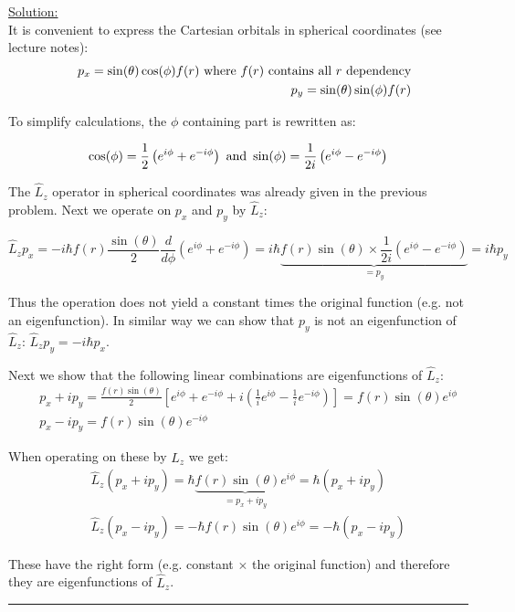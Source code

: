 \noindent
\underline{Solution:}\\

It is convenient to express the Cartesian orbitals in spherical coordinates (see lecture notes):
\begin{eqnarray}
\nonumber
& & p_x = \sin(\theta)\cos(\phi)f(r)\textnormal{ where }f(r)\textnormal{ contains all }r\textnormal{ dependency}\\
\nonumber
& & p_y = \sin(\theta)\sin(\phi)f(r)
\end{eqnarray}

To simplify calculations, the $\phi$ containing part is rewritten as:

$$\cos(\phi) = \frac{1}{2}\left(e^{i\phi} + e^{-i\phi}\right)\textnormal{ and }\sin(\phi) = \frac{1}{2i}\left(e^{i\phi} - e^{-i\phi}\right)$$

The $\hat{L}_z$ operator in spherical coordinates was already given in the previous problem. Next we operate on $p_x$ and $p_y$ by $\hat{L}_z$:

$$\hat{L}_zp_x = -i\hbar f(r)\frac{\sin(\theta)}{2}\frac{d}{d\phi}\left(e^{i\phi} + e^{-i\phi}\right) = i\hbar \underbrace{f(r)\sin(\theta)\times \frac{1}{2i}\left(e^{i\phi} - e^{-i\phi}\right)}_{= p_y} = i\hbar p_y
$$

Thus the operation does not yield a constant times the original function (e.g. not an eigenfunction). In similar way we can show that $p_y$ is not an eigenfunction of $\hat{L}_z$: $\hat{L}_zp_y = -i\hbar p_x$.

Next we show that the following linear combinations are eigenfunctions of $\hat{L}_z$:
\begin{eqnarray}
\nonumber
& & p_x + ip_y = \frac{f(r)\sin(\theta)}{2}\left[e^{i\phi} + e^{-i\phi} + i\left(\frac{1}{i}e^{i\phi} - \frac{1}{i}e^{-i\phi}\right)\right] = f(r)\sin(\theta)e^{i\phi}\\
\nonumber
& & p_x - ip_y = f(r)\sin(\theta)e^{-i\phi}
\end{eqnarray}

When operating on these by $\hat{L}_z$ we get:
\begin{eqnarray}
\nonumber
& & \hat{L}_z \left(p_x + ip_y\right) = \hbar\underbrace{f(r)\sin(\theta)e^{i\phi}}_{=p_x + ip_y} = \hbar(p_x + ip_y)\\
\nonumber
& & \hat{L}_z \left(p_x - ip_y\right) = -\hbar f(r)\sin(\theta)e^{i\phi} = -\hbar(p_x - ip_y)
\end{eqnarray}

These have the right form (e.g. constant $\times$ the original function) and therefore they are eigenfunctions of $\hat{L}_z$.

\hrule\vspace{0.5cm}
